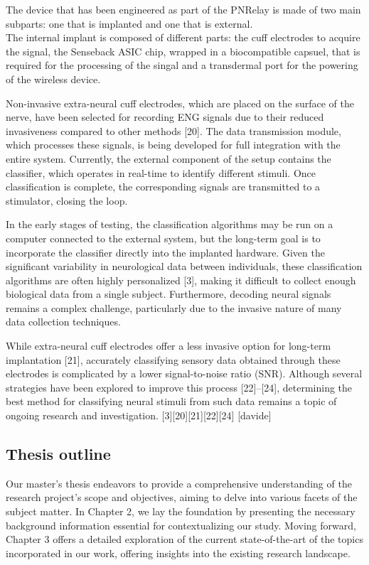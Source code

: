 \documentclass{Configuration_Files/PoliMi3i_thesis}
\begin{document}
The device that has been engineered as part of the PNRelay is made of two main subparts:
one that is implanted and one that is external.
\\
The internal implant is composed of different parts: the cuff electrodes to acquire the signal, the Senseback ASIC chip, wrapped in a biocompatible capsuel, that is required for the processing of the singal and a transdermal port for the powering of the wireless device.


Non-invasive extra-neural cuff electrodes, which are placed on the surface of the nerve, have been selected for recording ENG signals due to their reduced invasiveness compared to other methods [20]. The data transmission module, which processes these signals, is being developed for full integration with the entire system. Currently, the external component of the setup contains the classifier, which operates in real-time to identify different stimuli. Once classification is complete, the corresponding signals are transmitted to a stimulator, closing the loop.

In the early stages of testing, the classification algorithms may be run on a computer connected to the external system, but the long-term goal is to incorporate the classifier directly into the implanted hardware. Given the significant variability in neurological data between individuals, these classification algorithms are often highly personalized [3], making it difficult to collect enough biological data from a single subject. Furthermore, decoding neural signals remains a complex challenge, particularly due to the invasive nature of many data collection techniques.

While extra-neural cuff electrodes offer a less invasive option for long-term implantation [21], accurately classifying sensory data obtained through these electrodes is complicated by a lower signal-to-noise ratio (SNR). Although several strategies have been explored to improve this process [22]–[24], determining the best method for classifying neural stimuli from such data remains a topic of ongoing research and investigation. [3][20][21][22][24] [davide]

\subsection{Thesis outline}


Our master's thesis endeavors to provide a comprehensive understanding of the research project's scope and objectives, aiming to delve into various facets of the subject matter. In Chapter 2, we lay the foundation by presenting the necessary background information essential for contextualizing our study. Moving forward, Chapter 3 offers a detailed exploration of the current state-of-the-art of the topics incorporated in our work, offering insights into the existing research landscape.
\end{document}
